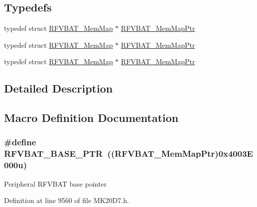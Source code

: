 \subsection*{Typedefs}
\begin{DoxyCompactItemize}
\item 
typedef struct \hyperlink{struct_r_f_v_b_a_t___mem_map}{R\+F\+V\+B\+A\+T\+\_\+\+Mem\+Map} $\ast$ \hyperlink{group___r_f_v_b_a_t___peripheral_gaf818ad4cab94790b0374758504777f4f}{R\+F\+V\+B\+A\+T\+\_\+\+Mem\+Map\+Ptr}
\item 
typedef struct \hyperlink{struct_r_f_v_b_a_t___mem_map}{R\+F\+V\+B\+A\+T\+\_\+\+Mem\+Map} $\ast$ \hyperlink{group___r_f_v_b_a_t___peripheral_gaf818ad4cab94790b0374758504777f4f}{R\+F\+V\+B\+A\+T\+\_\+\+Mem\+Map\+Ptr}
\item 
typedef struct \hyperlink{struct_r_f_v_b_a_t___mem_map}{R\+F\+V\+B\+A\+T\+\_\+\+Mem\+Map} $\ast$ \hyperlink{group___r_f_v_b_a_t___peripheral_gaf818ad4cab94790b0374758504777f4f}{R\+F\+V\+B\+A\+T\+\_\+\+Mem\+Map\+Ptr}
\end{DoxyCompactItemize}


\subsection{Detailed Description}


\subsection{Macro Definition Documentation}
\subsubsection[{\texorpdfstring{R\+F\+V\+B\+A\+T\+\_\+\+B\+A\+S\+E\+\_\+\+P\+TR}{RFVBAT_BASE_PTR}}]{\setlength{\rightskip}{0pt plus 5cm}\#define R\+F\+V\+B\+A\+T\+\_\+\+B\+A\+S\+E\+\_\+\+P\+TR~(({\bf R\+F\+V\+B\+A\+T\+\_\+\+Mem\+Map\+Ptr})0x4003\+E000u)}\hypertarget{group___r_f_v_b_a_t___peripheral_ga5b6418d9be20f84b2190ccf6134b7ba3}{}\label{group___r_f_v_b_a_t___peripheral_ga5b6418d9be20f84b2190ccf6134b7ba3}
Peripheral R\+F\+V\+B\+AT base pointer 

Definition at line 9560 of file M\+K20\+D7.\+h.

